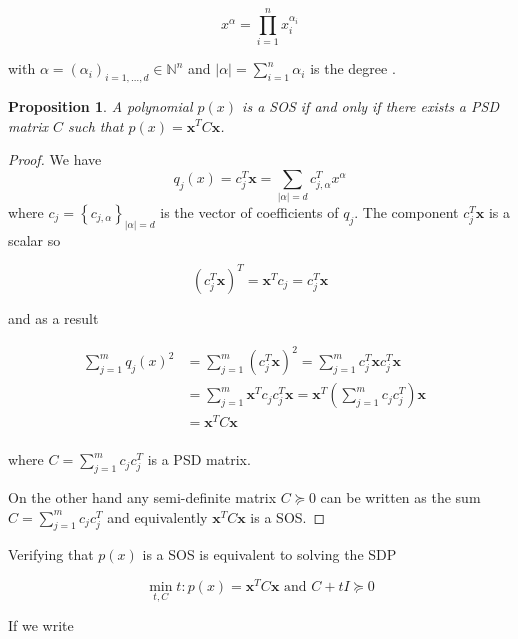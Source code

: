 \documentclass[onecolumn,11pt,a4paper]{article}
\theoremstyle{plain}  %
\newtheorem{proposition}[theorem]{Proposition}
\theoremstyle{remark}  %
\begin{document}
\[ x^\alpha = \prod_{i = 1}^n x_i^{\alpha_i} \]

with $\alpha = \left(
	\alpha_i \right)_{i = 1,\ldots,d} \in \mathbb{N}^n$  and $| \alpha | =
	\sum_{i = 1}^n \alpha_i $ is the degree . 
\begin{proposition}
	A polynomial $p(x)$ is a SOS if and only if there exists a PSD matrix $C$ such
	that $p(x) = \mathbf{x}^T C \mathbf{x}$.
\end{proposition}
	
	\begin{proof}
		We have 
		\begin{equation}
			q_j(x) = c_j^T \mathbf{x}  = \sum_{|\alpha|= d} c_{j, \alpha }^T x^{\alpha} 
		\end{equation}
		where $c_j = \left\{ c_{j, \alpha} \right\}_{|\alpha| = d}$ is the vector of
		coefficients of $q_j$. The component $c_j^T \mathbf{x}$ is a scalar so 

		\begin{equation}\left( c_j^T \mathbf{x}  \right)^T = \mathbf{x}^T c_j = c_j^T \mathbf{x}\end{equation}

		and as a result

		\begin{align*}	\sum_{j = 1}^m q_j (x)^2  & = \sum_{j = 1}^m \left( c_j^T \mathbf{x} 
			\right)^2   = \sum_{j = 1}^m c_j^T \mathbf{x} c_j^T \mathbf{x} \\ & = \sum_{j = 1}^m \mathbf{x}^T c_j
			c_j^T \mathbf{x}   =  \mathbf{x}^T \left( \sum_{j = 1}^m c_j c_j^T  \right)\mathbf{x} \\
			& = \mathbf{x}^T C \mathbf{x} & \\
		\end{align*}

		where $C = \sum_{j = 1}^m c_j c_j^T $ is a PSD matrix. 

		On the other hand any semi-definite matrix $C \succeq 0$ can be written as
		the sum $C = \sum_{j = 1}^m c_j c_j^T$ and equivalently $\mathbf{x}^T C
		\mathbf{x}$ is a SOS.
	\end{proof}

	Verifying that $p(x)$ is a SOS is equivalent to solving the SDP 

	\begin{equation}
		\min_{t, C} t : p(x) = \mathbf{x}^T C \mathbf{x} \text{ and } C + tI
		\succeq 0
		\label{}
	\end{equation}

	If we write
	
\end{document}

